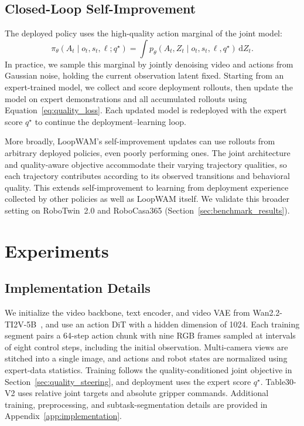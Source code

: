 \subsection{Closed-Loop Self-Improvement}
\label{sec:deployment_loop}

The deployed policy uses the high-quality action marginal of the joint model:
\begin{equation}
    \pi_\theta(A_t\mid o_t,s_t,\ell;q^\star)
    =\int p_\theta(A_t,Z_t\mid o_t,s_t,\ell,q^\star)\,\mathrm d Z_t.
    \label{eq:steered_policy}
\end{equation}
In practice, we sample this marginal by jointly denoising video and actions from Gaussian noise, holding the current observation latent fixed.
Starting from an expert-trained model, we collect and score deployment rollouts, then update the model on expert demonstrations and all accumulated rollouts using Equation~\ref{eq:quality_loss}.
Each updated model is redeployed with the expert score $q^\star$ to continue the deployment--learning loop.

More broadly, LoopWAM's self-improvement updates can use rollouts from arbitrary deployed policies, even poorly performing ones.
The joint architecture and quality-aware objective accommodate their varying trajectory qualities, so each trajectory contributes according to its observed transitions and behavioral quality.
This extends self-improvement to learning from deployment experience collected by other policies as well as LoopWAM itself.
We validate this broader setting on RoboTwin~2.0 and RoboCasa365 (Section~\ref{sec:benchmark_results}).

\section{Experiments}
\label{sec:experiments}

\subsection{Implementation Details}
\label{sec:implementation}

We initialize the video backbone, text encoder, and video VAE from Wan2.2-TI2V-5B~\citep{wan2025}, and use an action DiT with a hidden dimension of 1024.
Each training segment pairs a 64-step action chunk with nine RGB frames sampled at intervals of eight control steps, including the initial observation.
Multi-camera views are stitched into a single image, and actions and robot states are normalized using expert-data statistics.
Training follows the quality-conditioned joint objective in Section~\ref{sec:quality_steering}, and deployment uses the expert score $q^\star$.
Table30-V2 uses relative joint targets and absolute gripper commands.
Additional training, preprocessing, and subtask-segmentation details are provided in Appendix~\ref{app:implementation}.

